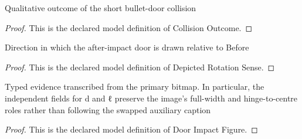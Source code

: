 \begin{definition}
  \label{def:physics:phyx-mini-0827:phyxminiproblems-problemphyxmini0827-collisionoutcome}
  Qualitative outcome of the short bullet-door collision
\end{definition}
\begin{proof}
  This is the declared model definition of Collision Outcome.
\end{proof}
\begin{definition}
  \label{def:physics:phyx-mini-0827:phyxminiproblems-problemphyxmini0827-depictedrotationsense}
  Direction in which the after-impact door is drawn relative to Before
\end{definition}
\begin{proof}
  This is the declared model definition of Depicted Rotation Sense.
\end{proof}
\begin{definition}
  \label{def:physics:phyx-mini-0827:phyxminiproblems-problemphyxmini0827-doorimpactfigure}
  Typed evidence transcribed from the primary bitmap. In particular, the independent fields for d and ℓ preserve the image's full-width and hinge-to-centre roles rather than following the swapped auxiliary caption
\end{definition}
\begin{proof}
  This is the declared model definition of Door Impact Figure.
\end{proof}
